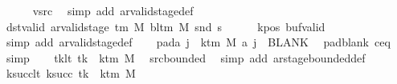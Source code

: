 \begin{isabellebody}
\ \ \ \ \isamarkupfalse%
\ vsrc\ \isamarkupfalse%
\ {\isacharparenleft}{\kern0pt}simp\ add{\isacharcolon}{\kern0pt}\ ar{\isacharunderscore}{\kern0pt}valid{\isacharunderscore}{\kern0pt}stage{\isacharunderscore}{\kern0pt}def{\isacharparenright}{\kern0pt}\isanewline
\ \ \isamarkupfalse%
\ dst{\isacharunderscore}{\kern0pt}valid{\isacharcolon}{\kern0pt}\ {\isachardoublequoteopen}ar{\isacharunderscore}{\kern0pt}valid{\isacharunderscore}{\kern0pt}stage\ {\isacharparenleft}{\kern0pt}{\isasymGamma}{\isacharunderscore}{\kern0pt}tm\ M{\isacharparenright}{\kern0pt}\ {\isacharparenleft}{\kern0pt}bl{\isacharunderscore}{\kern0pt}tm\ M{\isacharparenright}{\kern0pt}\ {\isacharparenleft}{\kern0pt}snd\ {\isacharquery}{\kern0pt}s{\isacharprime}{\kern0pt}{\isacharparenright}{\kern0pt}{\isachardoublequoteclose}\isanewline
\ \ \ \ \isamarkupfalse%
\ kpos\ buf{\isacharunderscore}{\kern0pt}valid\ \isamarkupfalse%
\ {\isacharparenleft}{\kern0pt}simp\ add{\isacharcolon}{\kern0pt}\ ar{\isacharunderscore}{\kern0pt}valid{\isacharunderscore}{\kern0pt}stage{\isacharunderscore}{\kern0pt}def{\isacharparenright}{\kern0pt}\isanewline
\ \ \isamarkupfalse%
\ pad{\isacharunderscore}{\kern0pt}a{\isacharcolon}{\kern0pt}\ {\isachardoublequoteopen}{\isasymforall}j\ {\isasymge}\ k{\isacharunderscore}{\kern0pt}tm\ M{\isachardot}{\kern0pt}\ {\isacharquery}{\kern0pt}a\ j\ {\isacharequal}{\kern0pt}\ BLANK{}{\isachardoublequoteclose}\ \isamarkupfalse%
\ pad{\isacharunderscore}{\kern0pt}blank\ c{\isacharprime}{\kern0pt}{\isacharunderscore}{\kern0pt}eq\ \isamarkupfalse%
\ simp\isanewline
\ \ \isamarkupfalse%
\ tk{\isacharunderscore}{\kern0pt}lt{\isacharcolon}{\kern0pt}\ {\isachardoublequoteopen}tk\ {\isacharless}{\kern0pt}\ k{\isacharunderscore}{\kern0pt}tm\ M{\isachardoublequoteclose}\ \isamarkupfalse%
\ src{\isacharunderscore}{\kern0pt}bounded\ \isamarkupfalse%
\ {\isacharparenleft}{\kern0pt}simp\ add{\isacharcolon}{\kern0pt}\ ar{\isacharunderscore}{\kern0pt}stage{\isacharunderscore}{\kern0pt}bounded{\isacharunderscore}{\kern0pt}def{\isacharparenright}{\kern0pt}\isanewline
\ \ \isamarkupfalse%
\ ksucc{\isacharunderscore}{\kern0pt}lt{\isacharcolon}{\kern0pt}\ {\isachardoublequoteopen}k{\isacharunderscore}{\kern0pt}succ\ tk\ {\isacharless}{\kern0pt}\ k{\isacharunderscore}{\kern0pt}tm\ M{\isachardoublequoteclose}\isanewline
\ \ \isamarkupfalse%

\end{isabellebody}
